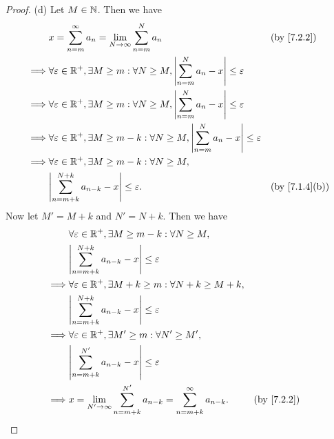 \begin{proof}{(d)}
  Let \(M \in \mathbb{N}\).
  Then we have
  \begin{align*}
             & x = \sum_{n = m}^\infty a_n = \lim_{N \to \infty} \sum_{n = m}^N a_n                                                 &  & \by{7.2.2}                  \\
    \implies & \forall \varepsilon \in \R^+, \exists M \geq m : \forall N \geq M, \abs{\sum_{n = m}^N a_n - x} \leq \varepsilon                                      \\
    \implies & \forall \varepsilon \in \R^+, \exists M \geq m : \forall N \geq M, \abs{\sum_{n = m}^N a_n - x} \leq \varepsilon                                      \\
    \implies & \forall \varepsilon \in \R^+, \exists M \geq m - k : \forall N \geq M, \abs{\sum_{n = m}^N a_n - x} \leq \varepsilon                                  \\
    \implies & \forall \varepsilon \in \R^+, \exists M \geq m - k : \forall N \geq M,                                                                                \\
             & \abs{\sum_{n = m + k}^{N + k} a_{n - k} - x} \leq \varepsilon.                                                       &  & \text{(by \cref{7.1.4}(b))}
  \end{align*}
  Now let \(M' = M + k\) and \(N' = N + k\).
  Then we have
  \begin{align*}
             & \forall \varepsilon \in \R^+, \exists M \geq m - k : \forall N \geq M,                                        \\
             & \abs{\sum_{n = m + k}^{N + k} a_{n - k} - x} \leq \varepsilon                                                 \\
    \implies & \forall \varepsilon \in \R^+, \exists M + k \geq m : \forall N + k \geq M + k,                                \\
             & \abs{\sum_{n = m + k}^{N + k} a_{n - k} - x} \leq \varepsilon                                                 \\
    \implies & \forall \varepsilon \in \R^+, \exists M' \geq m : \forall N' \geq M',                                         \\
             & \abs{\sum_{n = m + k}^{N'} a_{n - k} - x} \leq \varepsilon                                                    \\
    \implies & x = \lim_{N' \to \infty} \sum_{n = m + k}^{N'} a_{n - k} = \sum_{n = m + k}^\infty a_{n - k}. &  & \by{7.2.2}
  \end{align*}
\end{proof}

